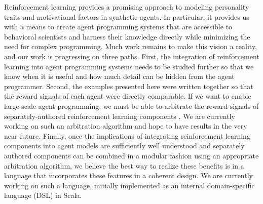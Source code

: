Reinforcement learning provides a promising approach to modeling personality traits and motivational factors in synthetic agents.  In particular, it provides us with a means to create agent programming systems that are accessible to behavioral scientists and harness their knowledge directly while minimizing the need for complex programming. Much work remains to make this vision a reality, and our work is progressing on three paths.  First, the integration of reinforcement learning into agent programming systems needs to be studied further so that we know when it is useful and how much detail can be hidden from the agent programmer.  Second, the examples presented here were written together so that the reward signals of each agent were directly comparable.  If we want to enable large-scale agent programming, we must be able to arbitrate the reward signals of separately-authored reinforcement learning components \cite{bhat2006on-the-difficulty}.  We are currently working on such an arbitration algorithm and hope to have results in the very near future.  Finally, once the implications of integrating reinforcement learning components into agent models are sufficiently well understood and separately authored components can be combined in a modular fashion using an appropriate arbitration algorithm, we believe the best way to realize these benefits is in a language that incorporates these features in a coherent design.  We are currently working on such a language, initially implemented as an internal domain-specific language (DSL) in Scala.

% 
